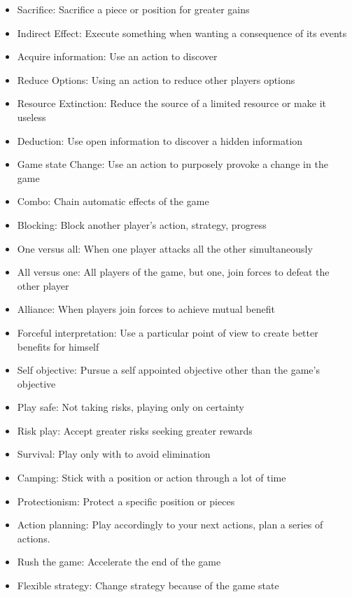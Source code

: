 \begin{multicols}{2}
    
\begin{itemize}
    \item Sacrifice: Sacrifice a piece or position for greater gains
    \item Indirect Effect: Execute something when wanting a consequence of its events
    \item Acquire information: Use an action to discover 
    \item Reduce Options: Using an action to reduce other players options
    \item Resource Extinction: Reduce the source of a limited resource or make it useless
    \item Deduction: Use open information to discover a hidden information
    \item Game state Change: Use an action to purposely provoke a change in the game
    \item Combo: Chain automatic effects of the game
    \item Blocking: Block another player's action, strategy, progress
    \item One versus all: When one player attacks all the other simultaneously 
    \item All versus one: All players of the game, but one, join forces to defeat the other player
    \item Alliance: When players join forces to achieve mutual benefit
    \item Forceful interpretation: Use a particular point of view to create better benefits for himself
    \item Self objective: Pursue a self appointed objective other than the game's objective
    \item Play safe: Not taking risks, playing only on certainty
    \item Risk play: Accept greater risks seeking greater rewards
    \item Survival: Play only with to avoid elimination
    \item Camping: Stick with a position or action through a lot of time
    \item Protectionism: Protect a specific position or pieces
    \item Action planning: Play accordingly to your next actions, plan a series of actions.
    \item Rush the game: Accelerate the end of the game
    \item Flexible strategy: Change strategy because of the game state

\end{itemize}
\end{multicols}
